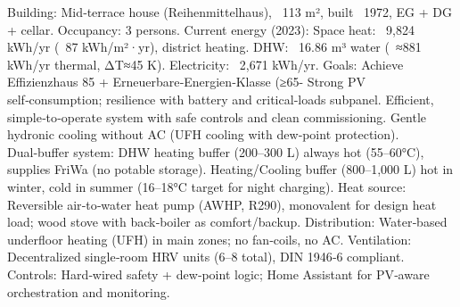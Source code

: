 \markdownRendererDocumentBegin
\markdownRendererSectionBegin
{}\markdownRendererInterblockSeparator
{}\markdownRendererUlBeginTight
\markdownRendererUlItem Building: Mid‑terrace house (Reihenmittelhaus), ~113 m², built ~1972, EG + DG + cellar.\markdownRendererUlItemEnd 
\markdownRendererUlItem Occupancy: 3 persons.\markdownRendererUlItemEnd 
\markdownRendererUlItem Current energy (2023):\markdownRendererUlItemEnd 
\markdownRendererUlItem Space heat: ~9,824 kWh/yr (~87 kWh/m²·yr), district heating.\markdownRendererUlItemEnd 
\markdownRendererUlItem DHW: ~16.86 m³ water (~≈881 kWh/yr thermal, ΔT≈45 K).\markdownRendererUlItemEnd 
\markdownRendererUlItem Electricity: ~2,671 kWh/yr.\markdownRendererUlItemEnd 
\markdownRendererUlItem Goals:\markdownRendererUlItemEnd 
\markdownRendererUlItem Achieve Effizienzhaus 85 + Erneuerbare‑Energien‑Klasse (≥65- Strong PV self‑consumption; resilience with battery and critical‑loads subpanel.\markdownRendererUlItemEnd 
\markdownRendererUlItem Efficient, simple‑to‑operate system with safe controls and clean commissioning.\markdownRendererUlItemEnd 
\markdownRendererUlItem Gentle hydronic cooling without AC (UFH cooling with dew‑point protection).\markdownRendererUlItemEnd 
\markdownRendererUlEndTight \markdownRendererInterblockSeparator
{}\markdownRendererSectionBegin
{}\markdownRendererInterblockSeparator
{}\markdownRendererUlBeginTight
\markdownRendererUlItem Dual‑buffer system:\markdownRendererUlItemEnd 
\markdownRendererUlItem DHW heating buffer (200–300 L) always hot (55–60°C), supplies FriWa (no potable storage).\markdownRendererUlItemEnd 
\markdownRendererUlItem Heating/Cooling buffer (800–1,000 L) hot in winter, cold in summer (16–18°C target for night charging).\markdownRendererUlItemEnd 
\markdownRendererUlItem Heat source: Reversible air‑to‑water heat pump (AWHP, R290), monovalent for design heat load; wood stove with back‑boiler as comfort/backup.\markdownRendererUlItemEnd 
\markdownRendererUlItem Distribution: Water‑based underfloor heating (UFH) in main zones; no fan‑coils, no AC.\markdownRendererUlItemEnd 
\markdownRendererUlItem Ventilation: Decentralized single‑room HRV units (6–8 total), DIN 1946‑6 compliant.\markdownRendererUlItemEnd 
\markdownRendererUlItem Controls: Hard‑wired safety + dew‑point logic; Home Assistant for PV‑aware orchestration and monitoring.\markdownRendererUlItemEnd 
\markdownRendererUlEndTight \markdownRendererInterblockSeparator
{}
\markdownRendererSectionEnd \markdownRendererSectionBegin
{}\markdownRendererInterblockSeparator
